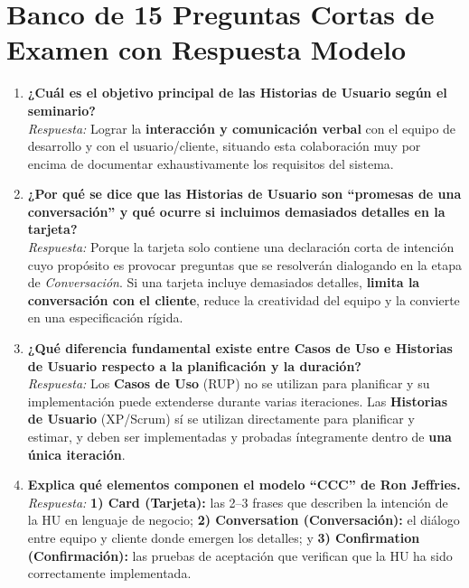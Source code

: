 \section{Banco de 15 Preguntas Cortas de Examen con Respuesta Modelo}

\begin{enumerate}[label=\textbf{P\arabic*.}, itemsep=6pt]
    \item \textbf{¿Cuál es el objetivo principal de las Historias de Usuario según el seminario?}\\
    \textit{Respuesta:} Lograr la \textbf{interacción y comunicación verbal} con el equipo de desarrollo y con el usuario/cliente, situando esta colaboración muy por encima de documentar exhaustivamente los requisitos del sistema.

    \item \textbf{¿Por qué se dice que las Historias de Usuario son ``promesas de una conversación'' y qué ocurre si incluimos demasiados detalles en la tarjeta?}\\
    \textit{Respuesta:} Porque la tarjeta solo contiene una declaración corta de intención cuyo propósito es provocar preguntas que se resolverán dialogando en la etapa de \textit{Conversación}. Si una tarjeta incluye demasiados detalles, \textbf{limita la conversación con el cliente}, reduce la creatividad del equipo y la convierte en una especificación rígida.

    \item \textbf{¿Qué diferencia fundamental existe entre Casos de Uso e Historias de Usuario respecto a la planificación y la duración?}\\
    \textit{Respuesta:} Los \textbf{Casos de Uso} (RUP) no se utilizan para planificar y su implementación puede extenderse durante varias iteraciones. Las \textbf{Historias de Usuario} (XP/Scrum) sí se utilizan directamente para planificar y estimar, y deben ser implementadas y probadas íntegramente dentro de \textbf{una única iteración}.

    \item \textbf{Explica qué elementos componen el modelo ``CCC'' de Ron Jeffries.}\\
    \textit{Respuesta:} \textbf{1) Card (Tarjeta):} las 2--3 frases que describen la intención de la HU en lenguaje de negocio; \textbf{2) Conversation (Conversación):} el diálogo entre equipo y cliente donde emergen los detalles; y \textbf{3) Confirmation (Confirmación):} las pruebas de aceptación que verifican que la HU ha sido correctamente implementada.


\end{enumerate}
